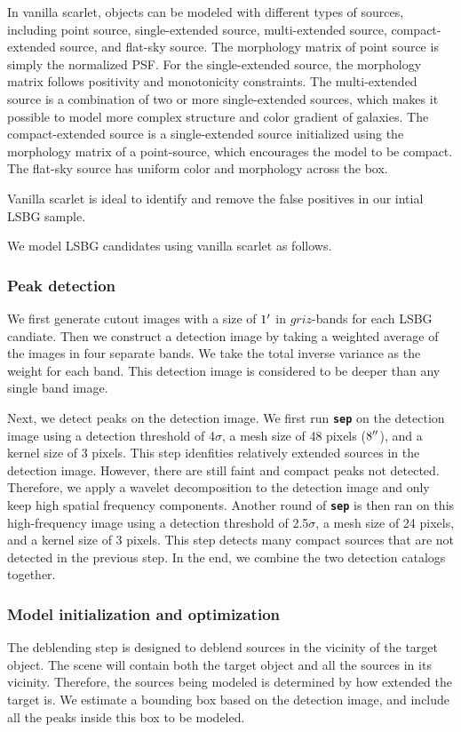 \documentclass[twocolumn,astrosymb,twocolappendix]{aastex631}
\newcommand{\code}[1]{\textbf{\texttt{#1}}}
\begin{document}
\begin{CJK*}{UTF8}{gbsn}
In vanilla scarlet, objects can be modeled with different types of sources, including point source, single-extended source, multi-extended source, compact-extended source, and flat-sky source. The morphology matrix of point source is simply the normalized PSF. For the single-extended source, the morphology matrix follows positivity and monotonicity constraints. The multi-extended source is a combination of two or more single-extended sources, which makes it possible to model more complex structure and color gradient of galaxies. The compact-extended source is a single-extended source initialized using the morphology matrix of a point-source, which encourages the model to be compact. The flat-sky source has uniform color and morphology across the box.

Vanilla scarlet is ideal to identify and remove the false positives in our intial LSBG sample. 

We model LSBG candidates using vanilla scarlet as follows. 

\subsubsection{Peak detection}
We first generate cutout images with a size of $1\mbox{$^\prime$}$ in $griz$-bands for each LSBG candiate. Then we construct a detection image by taking a weighted average of the images in four separate bands. We take the total inverse variance as the weight for each band. This detection image is considered to be deeper than any single band image. 

Next, we detect peaks on the detection image. We first run \code{sep} on the detection image using a detection threshold of 4$\sigma$, a mesh size of 48 pixels ($8\mbox{$^{\prime\prime}$}$), and a kernel size of 3 pixels. This step idenfities relatively extended sources in the detection image. However, there are still faint and compact peaks not detected. Therefore, we apply a wavelet decomposition to the detection image \citep{Starck2015} and only keep high spatial frequency components. Another round of \code{sep} is then ran on this high-frequency image using a detection threshold of 2.5$\sigma$, a mesh size of 24 pixels, and a kernel size of 3 pixels. This step detects many compact sources that are not detected in the previous step. In the end, we combine the two detection catalogs together. 

\subsubsection{Model initialization and optimization}
The deblending step is designed to deblend sources in the vicinity of the target object. The scene will contain both the target object and all the sources in its vicinity. Therefore, the sources being modeled is determined by how extended the target is. We estimate a bounding box based on the detection image, and include all the peaks inside this box to be modeled.


\end{CJK*}
\end{document}
